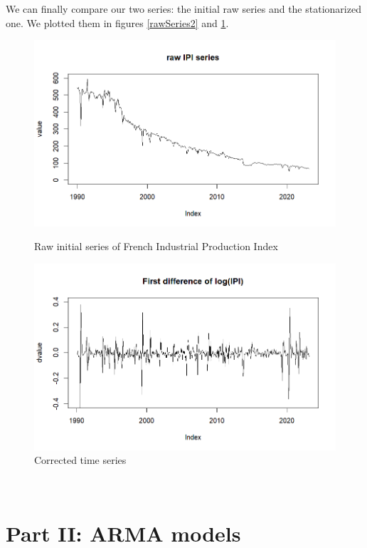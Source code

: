 \documentclass[]{article}
\begin{document}
We can finally compare our two series: the initial raw series and the stationarized one. We plotted them in figures \ref{rawSeries2} and \ref{stationarySeries}.
\begin{figure}[!h]
	\centering
	\begin{minipage}{0.45 \linewidth}
		\centering
		\includegraphics[scale=0.4]{raw_series.png}
		\caption{Raw initial series of French Industrial Production Index}
		\label{rawSeries2}
	\end{minipage}
	\hfill
	\begin{minipage}{0.48 \linewidth}
		\centering
		\includegraphics[scale=0.4]{stationary_series.png}
		\caption{Corrected time series}
		\label{stationarySeries}
	\end{minipage}
\end{figure}\\

\newpage
\section{Part II:  ARMA models}
\end{document}
